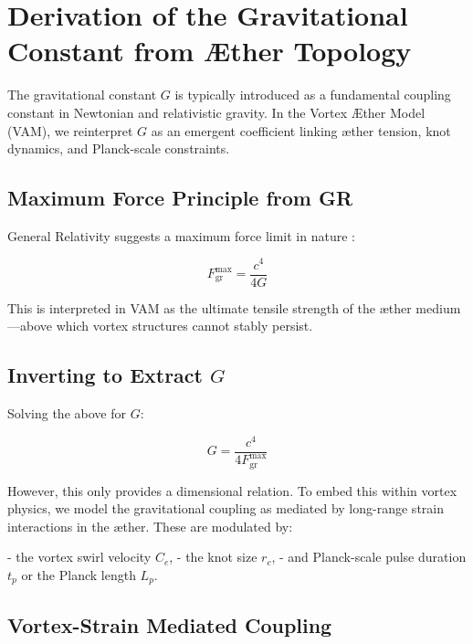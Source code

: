 
\section{Derivation of the Gravitational Constant from Æther Topology}
\label{appendix:G}

The gravitational constant \( G \) is typically introduced as a fundamental coupling constant in Newtonian and relativistic gravity. In the Vortex Æther Model (VAM), we reinterpret \( G \) as an emergent coefficient linking æther tension, knot dynamics, and Planck-scale constraints.

\subsection*{Maximum Force Principle from GR}

General Relativity suggests a maximum force limit in nature \cite{scharf2016force,barcelo2011}:

\begin{equation}
    F^{\text{max}}_{\text{gr}} = \frac{c^4}{4G}
\end{equation}

This is interpreted in VAM as the ultimate tensile strength of the æther medium—above which vortex structures cannot stably persist.

\subsection*{Inverting to Extract \( G \)}

Solving the above for \( G \):

\begin{equation}
    G = \frac{c^4}{4 F^{\text{max}}_{\text{gr}}}
\end{equation}

However, this only provides a dimensional relation. To embed this within vortex physics, we model the gravitational coupling as mediated by long-range strain interactions in the æther. These are modulated by:

- the vortex swirl velocity \( C_e \),
- the knot size \( r_c \),
- and Planck-scale pulse duration \( t_p \) or the Planck length \( L_p \).

\subsection*{Vortex-Strain Mediated Coupling}

